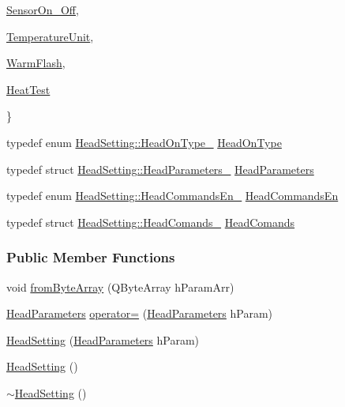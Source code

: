 \begin{DoxyCompactItemize}
\begin{DoxyCompactItemize}
\item\mbox{\hyperlink{classHeadSetting_aa59726f2f3a2b18d1735f9983277da98a3efa2ea7cfcf8e1957d03cd5c7d94c73}{Sensor\+On\+\_\+\+Off}}, 
\item\mbox{\hyperlink{classHeadSetting_aa59726f2f3a2b18d1735f9983277da98ae12b79aa3b79ec4532f8e495f39f7e32}{Temperature\+Unit}}, 
\item\mbox{\hyperlink{classHeadSetting_aa59726f2f3a2b18d1735f9983277da98ae97e894d0d329ba1d4b3f73574a7bc03}{Warm\+Flash}}, 
\item\mbox{\hyperlink{classHeadSetting_aa59726f2f3a2b18d1735f9983277da98a820722173069b7b070743e1e0d699dfd}{Heat\+Test}}
 \end{DoxyCompactItemize}
 \}
\item 
typedef enum \mbox{\hyperlink{classHeadSetting_a4b20eca534a73ccbb980a216ea17c2a0}{Head\+Setting\+::\+Head\+On\+Type\+\_\+}} \mbox{\hyperlink{classHeadSetting_adc03f84127a636868de8f79fb7b5046d}{Head\+On\+Type}}
\item 
typedef struct \mbox{\hyperlink{structHeadSetting_1_1HeadParameters__}{Head\+Setting\+::\+Head\+Parameters\+\_\+}} \mbox{\hyperlink{classHeadSetting_ab604bc48df56fc11dd649357ae7b45b8}{Head\+Parameters}}
\item 
typedef enum \mbox{\hyperlink{classHeadSetting_aa59726f2f3a2b18d1735f9983277da98}{Head\+Setting\+::\+Head\+Commands\+En\+\_\+}} \mbox{\hyperlink{classHeadSetting_afe9523cb7fbbae2db026b1fca4a02be3}{Head\+Commands\+En}}
\item 
typedef struct \mbox{\hyperlink{structHeadSetting_1_1HeadComands__}{Head\+Setting\+::\+Head\+Comands\+\_\+}} \mbox{\hyperlink{classHeadSetting_a53d6fb7e789941346f1fb2094317a78e}{Head\+Comands}}
\end{DoxyCompactItemize}
\subsubsection*{Public Member Functions}
\begin{DoxyCompactItemize}
\item 
void \mbox{\hyperlink{classHeadSetting_a14f70fd21c7b49f6ac0ebc71cef6583b}{from\+Byte\+Array}} (Q\+Byte\+Array h\+Param\+Arr)
\item 
\mbox{\hyperlink{classHeadSetting_ab604bc48df56fc11dd649357ae7b45b8}{Head\+Parameters}} \mbox{\hyperlink{classHeadSetting_a63424c056f596a8d30a10247841056a5}{operator=}} (\mbox{\hyperlink{classHeadSetting_ab604bc48df56fc11dd649357ae7b45b8}{Head\+Parameters}} h\+Param)
\item 
\mbox{\hyperlink{classHeadSetting_a917fa6a3f5a948babf7a4ac2da7ba665}{Head\+Setting}} (\mbox{\hyperlink{classHeadSetting_ab604bc48df56fc11dd649357ae7b45b8}{Head\+Parameters}} h\+Param)
\item 
\mbox{\hyperlink{classHeadSetting_af36d589b132ae92d8288a0e896d5cfd5}{Head\+Setting}} ()
\item 
\mbox{\hyperlink{classHeadSetting_a0330e2d60a22fda9da5e85ce6a804ee3}{$\sim$\+Head\+Setting}} ()
\end{DoxyCompactItemize}
